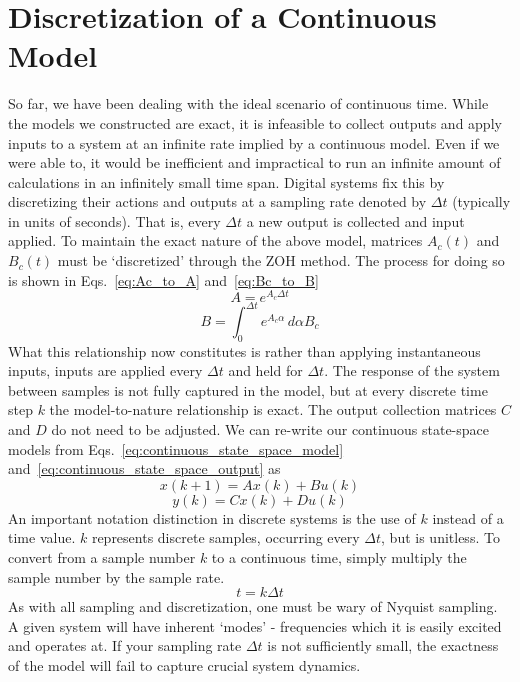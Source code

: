 \FloatBarrier\section{Discretization of a Continuous Model} %
So far, we have been dealing with the ideal scenario of continuous time. While the models we constructed are exact, it is infeasible to collect outputs and apply inputs to a system at an infinite rate implied by a continuous model. Even if we were able to, it would be inefficient and impractical to run an infinite amount of calculations in an infinitely small time span. 
Digital systems fix this by discretizing their actions and outputs at a sampling rate denoted by $\Delta t$ (typically in units of seconds).  That is, every $\Delta t$ a new output is collected and input applied. To maintain the exact nature of the above model, matrices $A_c(t)$ and $B_c(t)$ must be `discretized' through the \ac{ZOH} method. The process for doing so is shown in Eqs.~\ref{eq:Ac_to_A} and~\ref{eq:Bc_to_B}
\begin{equation}
    A = e^{A_c \Delta t}
    \label{eq:Ac_to_A}
\end{equation}
\begin{equation}
    B = \int_{0}^{\Delta t}  e^{A_c \alpha}\,d\alpha B_c 
    \label{eq:Bc_to_B}
\end{equation}
What this relationship now constitutes is rather than applying instantaneous inputs, inputs are applied every $\Delta t$ and held for $\Delta t$. The response of the system between samples is not fully captured in the model, but at every discrete time step $k$ the model-to-nature relationship is exact. The output collection matrices $C$ and $D$ do not need to be adjusted. We can re-write our continuous state-space models from Eqs.~\ref{eq:continuous_state_space_model} and~\ref{eq:continuous_state_space_output} as
\begin{equation}
    x(k+1) = Ax(k) + Bu(k)
    \label{eq:discrete_state_space_model}
\end{equation}
\begin{equation}
    y(k) = Cx(k) + Du(k)
    \label{eq:discrete_state_space_output}
\end{equation}
An important notation distinction in discrete systems is the use of $k$ instead of a time value. $k$ represents discrete samples, occurring every $\Delta t$, but is unitless. To convert from a sample number $k$ to a continuous time, simply multiply the sample number by the sample rate.
\begin{equation}
    t = k \Delta t
    \label{eq:samples_to_time}
\end{equation}
As with all sampling and discretization, one must be wary of Nyquist sampling. A given system will have inherent `modes' - frequencies which it is easily excited and operates at. If your sampling rate $\Delta t$ is not sufficiently small, the exactness of the model will fail to capture crucial system dynamics.

